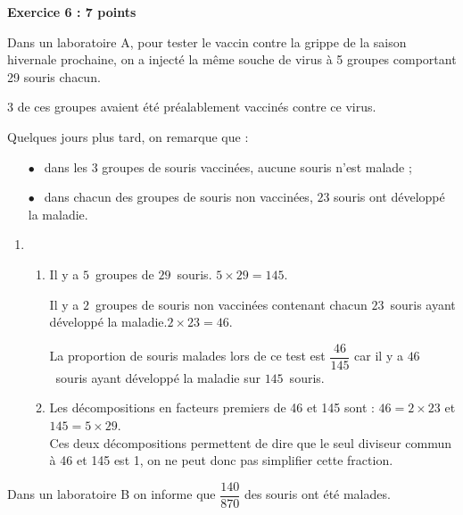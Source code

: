 \documentclass[10pt]{article}
\begin{document}
\vspace{0,5cm}

\textbf{Exercice 6 :  \hfill 7 points}

\medskip

Dans un laboratoire A, pour tester le vaccin contre la grippe de la saison hivernale prochaine, on a injecté la même souche de virus à  5 groupes comportant 29 souris chacun.

3 de ces groupes avaient été préalablement vaccinés contre ce virus.

Quelques jours plus tard, on remarque que :

\setlength\parindent{10mm}
\begin{itemize}
\item[$\bullet~~$] dans les $3$ groupes de souris vaccinées, aucune souris n'est malade ;
\item[$\bullet~~$] dans chacun des groupes de souris non vaccinées, $23$ souris ont développé la maladie.
\end{itemize}
\setlength\parindent{0mm} 

\medskip
 
\begin{enumerate}
\item 
	\begin{enumerate}
		\item Il y a $5$~groupes de $29$~souris. $5\times29=145$.
		
Il y a $2$~groupes de souris non vaccinées contenant chacun $23$~souris ayant développé la maladie.$2\times23=46$.
		
		 La proportion de souris malades lors de ce test est $\dfrac{46}{145}$ car il y a $46$~souris ayant développé la maladie sur $145$~souris.
		\item Les décompositions en facteurs premiers de 46 et 145 sont : \quad $46=2\times23$ et $145=5\times29$. \\
		Ces deux décompositions permettent de dire que le seul diviseur commun à 46 et 145 est 1, on ne peut donc pas simplifier cette fraction.
	\end{enumerate}	
\end{enumerate}
		
Dans un laboratoire B on informe que $\dfrac{140}{870}$ des souris ont été malades.
\end{document}
